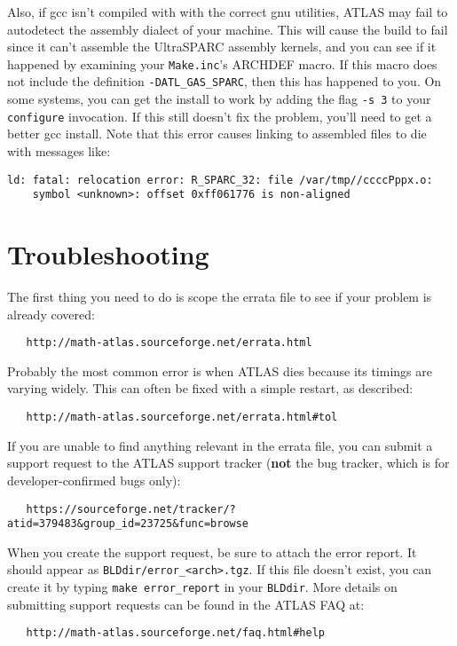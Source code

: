 \documentclass[11pt]{article}
\begin{document}
Also, if gcc isn't compiled with with the correct gnu utilities, ATLAS
may fail to autodetect the assembly dialect of your machine.  This
will cause the build to fail since it can't assemble the UltraSPARC
assembly kernels, and you can see if it happened by examining your
{\tt Make.inc}'s ARCHDEF macro.  If this macro does not include
the definition {\tt -DATL\_GAS\_SPARC}, then this has happened to you.
On some systems, you can get the install to work by adding the flag
{\tt -s 3} to your {\tt configure} invocation.  If this still doesn't 
fix the problem, you'll need to get a better gcc install.  Note that
this error causes linking to assembled files to die with messages like:
\vspace{-0.05in}
\begin{verbatim}
ld: fatal: relocation error: R_SPARC_32: file /var/tmp//ccccPppx.o: 
    symbol <unknown>: offset 0xff061776 is non-aligned
\end{verbatim}

\section{Troubleshooting}
The first thing you need to do is scope the errata file to see if your
problem is already covered:
\vspace*{-0.1in}
\begin{verbatim}
   http://math-atlas.sourceforge.net/errata.html
\end{verbatim}

Probably the most common error is when ATLAS dies because its timings are
varying widely.  This can often be fixed with a simple restart, as described:
\vspace*{-0.1in}
\begin{verbatim}
   http://math-atlas.sourceforge.net/errata.html#tol
\end{verbatim}

If you are unable to find anything relevant in the errata file, you can
submit a support request to the ATLAS support tracker ({\bf not} the
bug tracker, which is for developer-confirmed bugs only):
\vspace*{-0.1in}
\begin{verbatim}
   https://sourceforge.net/tracker/?atid=379483&group_id=23725&func=browse
\end{verbatim}

When you create the support request, be sure to attach the error report.
It should appear as \verb|BLDdir/error_<arch>.tgz|.  If this file doesn't
exist, you can create it by typing \verb|make error_report| in your
{\tt BLDdir}.  More details on submitting support requests can be found
in the ATLAS FAQ at:
\vspace*{-0.1in}
\begin{verbatim}
   http://math-atlas.sourceforge.net/faq.html#help
\end{verbatim}
\end{document}
